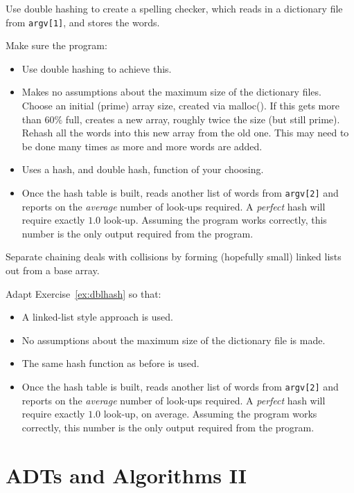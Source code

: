 \begin{exercise}
\label{ex:dblhash}
Use double hashing to create a spelling checker, which reads in a dictionary file
from \verb^argv[1]^, and stores the words.

Make sure the program:
\begin{itemize}
\item Use double hashing to achieve this.
\item Makes no assumptions about the maximum size of the dictionary files. Choose
an initial (prime) array size, created via malloc(). If this gets more than $60\%$ full,
creates a new array, roughly twice the size (but still prime). Rehash all the words into this
new array from the old one. This may need to be done many times as more and more words
are added.
\item Uses a hash, and double hash, function of your choosing.
\item Once the hash table is built, reads another list of words from \verb^argv[2]^
and reports on the {\em average} number of  look-ups required. A {\em perfect} hash
will require exactly $1.0$ look-up. Assuming the program works correctly,
this number is the only output required from the program.
\end{itemize}
\end{exercise}

Separate chaining deals with collisions by forming (hopefully small) linked lists
out from a base array.
\begin{exercise}
Adapt Exercise~\ref{ex:dblhash} so that:
\begin{itemize}
\item A linked-list style approach is used.
\item No assumptions about the maximum size of the dictionary file is made.
\item The same hash function as before is used.
\item Once the hash table is built, reads another list of words from \verb^argv[2]^
and reports on the {\em average} number of  look-ups required. A {\em perfect} hash
will require exactly $1.0$ look-up, on average. Assuming the program works correctly,
this number is the only output required from the program.
\end{itemize}
\end{exercise}

\chapter{ADTs and Algorithms II}

